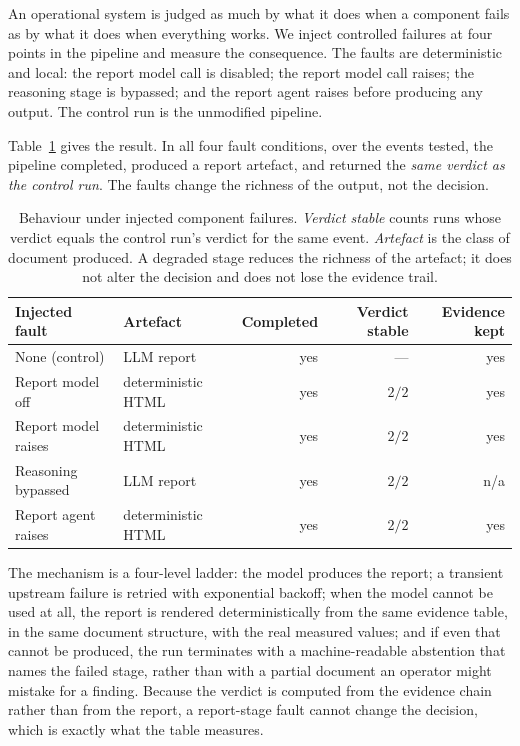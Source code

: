 An operational system is judged as much by what it does when a component
fails as by what it does when everything works. We inject controlled
failures at four points in the pipeline and measure the consequence. The
faults are deterministic and local: the report model call is disabled; the
report model call raises; the reasoning stage is bypassed; and the report
agent raises before producing any output. The control run is the unmodified
pipeline.

Table~\ref{tab:agent-degradation} gives the result. In all four fault
conditions, over the events tested, the pipeline completed, produced a
report artefact, and returned the \emph{same verdict as the control run}.
The faults change the richness of the output, not the decision.

\begin{table}[t]
\centering
\caption{Behaviour under injected component failures. \emph{Verdict
stable} counts runs whose verdict equals the control run's verdict for
the same event. \emph{Artefact} is the class of document produced.
A degraded stage reduces the richness of the artefact; it does not alter
the decision and does not lose the evidence trail.}
\label{tab:agent-degradation}
\small
\setlength{\tabcolsep}{4pt}
\begin{tabular}{@{}llrrr@{}}
\hline
\textbf{Injected fault} & \textbf{Artefact} & \textbf{Completed}
  & \textbf{Verdict stable} & \textbf{Evidence kept} \\
\hline
None (control)      & LLM report          & yes & ---      & yes \\
Report model off    & deterministic HTML  & yes & $2/2$    & yes \\
Report model raises & deterministic HTML  & yes & $2/2$    & yes \\
Reasoning bypassed  & LLM report          & yes & $2/2$    & n/a \\
Report agent raises & deterministic HTML  & yes & $2/2$    & yes \\
\hline
\end{tabular}
\end{table}

The mechanism is a four-level ladder: the model produces the report; a
transient upstream failure is retried with exponential backoff; when the
model cannot be used at all, the report is rendered deterministically from
the same evidence table, in the same document structure, with the real
measured values; and if even that cannot be produced, the run terminates
with a machine-readable abstention that names the failed stage, rather than
with a partial document an operator might mistake for a finding. Because
the verdict is computed from the evidence chain rather than from the
report, a report-stage fault cannot change the decision, which is exactly
what the table measures.


